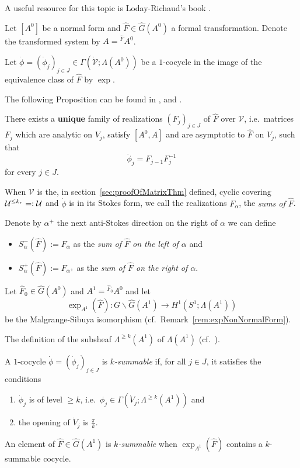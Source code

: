 A useful resource for this topic is Loday-Richaud's book \cite{Loday2014}.

Let $[A^0]$ be a normal form and $\hat F\in\hat G(A^0)$ a formal
transformation. Denote the transformed system by $A={}^{\hat F}\!A^0$.

Let $\dot\phi=(\dot\phi_j)_{j\in J}\in\Gamma(\dot{\mathcal{V}};\Lambda(A^0))$
be a $1$-cocycle in the image of the equivalence class of $\hat F$ by $\exp$.

The following Proposition can be found in \cite[Prop.III.2.1]{Loday1994},
\cite[Thm.4.3.13]{Loday2014} and \cite[Thm.1]{BJL1979Birkhoff}.
\begin{prop}\label{prop:multisummability}
  There exists a \textbf{unique} family of realizations $(F_j)_{j\in J}$ of
  $\hat F$ over $\mathcal{V}$, i.e.\ matrices $F_j$ which are analytic on
  $V_j$, satisfy $[A^0,A]$ and are asymptotic to $\hat F$ on $V_j$, such that
  \[
    \dot\phi_j=F_{j-1}F_j^{-1}
  \]
  for every $j\in J$.
\end{prop}
When $\mathcal{V}$ is the, in section~\ref{sec:proofOfMatrixThm} defined,
cyclic covering $\mathcal{U}^{\leq k_r}=:\mathcal{U}$ and $\dot\phi$ is in its Stokes 
form\TODO[~(cf.~??)], we call the realizations $F_{\alpha}$, the
\emph{sums of $\hat F$}.
\begin{defn}\label{defn:sumsLeftRight}
  Denote by $\alpha^+$ the next anti-Stokes direction on the right of $\alpha$
  we can define
  \begin{itemize}
    \item $S_\alpha^-(\hat F):=F_\alpha$ as the \emph{sum of $\hat F$ on the
      left of $\alpha$} and
    \item $S_\alpha^+(\hat F):=F_{\alpha^+}$ as the \emph{sum of $\hat F$ on
      the right of $\alpha$}.
  \end{itemize}
\end{defn}

Let $\hat F_0\in\hat G(A^0)$ and $A^1={}^{\hat F_0}\!A^0$ and let
\[
  \exp_{A^1}(\hat F):G\backslash\hat G(A^1) \to H^1(S^1;\Lambda(A^1))
\]
be the Malgrange-Sibuya isomorphism (cf.\ Remark~\ref{rem:expNonNormalForm}).

The definition of the subsheaf $\Lambda^{\geq k}(A^1)$ of $\Lambda(A^1)$
 (cf.\ \cite[883]{Loday1994}).
\begin{defn}
  A $1$-cocycle $\dot\phi=(\dot\phi_j)_{j\in J}$ is \emph{$k$-summable} if, for
  all $j\in J$, it satisfies the conditions
  \begin{enumerate}
    \item $\dot\phi_j$ is of level $\geq k$,
      i.e.\ $\phi_j\in\Gamma(\dot V_j;\Lambda^{\geq k}(A^1))$ and
    \item the opening of $\dot V_j$ is $\frac{\pi}{k}$.
  \end{enumerate}
  An element of $\hat F\in\hat G(A^1)$ is \emph{$k$-summable} when
  $\exp_{A^1}(\hat F)$ contains a $k$-summable cocycle.
\end{defn}

